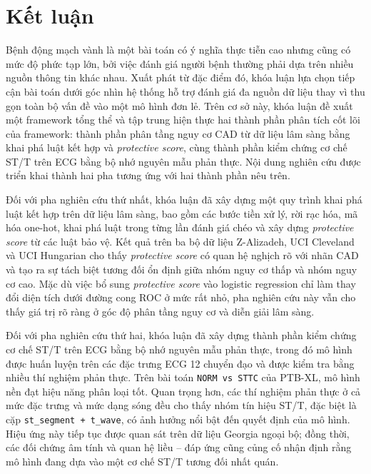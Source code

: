 \clearpage
{}

\chapter*{Kết luận}

Bệnh động mạch vành là một bài toán có ý nghĩa thực tiễn cao nhưng cũng có mức độ phức tạp lớn, bởi việc đánh giá người bệnh thường phải dựa trên nhiều nguồn thông tin khác nhau. Xuất phát từ đặc điểm đó, khóa luận lựa chọn tiếp cận bài toán dưới góc nhìn hệ thống hỗ trợ đánh giá đa nguồn dữ liệu thay vì thu gọn toàn bộ vấn đề vào một mô hình đơn lẻ. Trên cơ sở này, khóa luận đề xuất một framework tổng thể và tập trung hiện thực hai thành phần phân tích cốt lõi của framework: thành phần phân tầng nguy cơ CAD từ dữ liệu lâm sàng bằng khai phá luật kết hợp và \textit{protective score}, cùng thành phần kiểm chứng cơ chế ST/T trên ECG bằng bộ nhớ nguyên mẫu phản thực. Nội dung nghiên cứu được triển khai thành hai pha tương ứng với hai thành phần nêu trên.

\blocksep

Đối với pha nghiên cứu thứ nhất, khóa luận đã xây dựng một quy trình khai phá luật kết hợp trên dữ liệu lâm sàng, bao gồm các bước tiền xử lý, rời rạc hóa, mã hóa one-hot, khai phá luật trong từng lần đánh giá chéo và xây dựng \textit{protective score} từ các luật bảo vệ. Kết quả trên ba bộ dữ liệu Z-Alizadeh, UCI Cleveland và UCI Hungarian cho thấy \textit{protective score} có quan hệ nghịch rõ với nhãn CAD và tạo ra sự tách biệt tương đối ổn định giữa nhóm nguy cơ thấp và nhóm nguy cơ cao. Mặc dù việc bổ sung \textit{protective score} vào logistic regression chỉ làm thay đổi diện tích dưới đường cong ROC ở mức rất nhỏ, pha nghiên cứu này vẫn cho thấy giá trị rõ ràng ở góc độ phân tầng nguy cơ và diễn giải lâm sàng.

\blocksep

Đối với pha nghiên cứu thứ hai, khóa luận đã xây dựng thành phần kiểm chứng cơ chế ST/T trên ECG bằng bộ nhớ nguyên mẫu phản thực, trong đó mô hình được huấn luyện trên các đặc trưng ECG 12 chuyển đạo và được kiểm tra bằng nhiều thí nghiệm phản thực. Trên bài toán \texttt{NORM vs STTC} của PTB-XL, mô hình nền đạt hiệu năng phân loại tốt. Quan trọng hơn, các thí nghiệm phản thực ở cả mức đặc trưng và mức dạng sóng đều cho thấy nhóm tín hiệu ST/T, đặc biệt là cặp \texttt{st\_segment + t\_wave}, có ảnh hưởng nổi bật đến quyết định của mô hình. Hiệu ứng này tiếp tục được quan sát trên dữ liệu Georgia ngoại bộ; đồng thời, các đối chứng âm tính và quan hệ liều -- đáp ứng cũng củng cố nhận định rằng mô hình đang dựa vào một cơ chế ST/T tương đối nhất quán.

